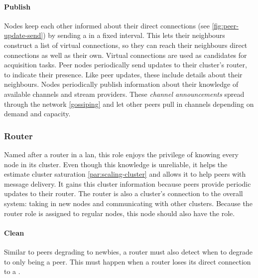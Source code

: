 \paragraph{Publish}\label{par:design-roles-peer-publish}
\begin{itemize}
     Nodes keep each other informed about their direct connections (see \vref{fig:peer-update-send}) by sending a \peerUpdate in a fixed interval. This lets their neighbours construct a list of virtual connections, so they can reach their neighbours direct connections as well as their own. Virtual connections are used as candidates for acquisition tasks.
     Peer nodes periodically send updates to their cluster's router, to indicate their presence. Like peer updates, these include details about their neighbours.
    \label{item:peer-publish-channel-announcement} Nodes periodically publish information about their knowledge of available channels and stream providers. These \textit{channel announcements} spread through the network \ref{gossiping} and let other peers pull in channels depending on demand and capacity.
\end{itemize}

\subsubsection{Router}\label{sec:design-roles-router}
Named after a router in a \gls{lan}, this role enjoys the privilege of knowing every node in its cluster. Even though this knowledge is unreliable, it helps the \routerRole estimate cluster saturation \cref{par:scaling-cluster} and allows it to help peers with message delivery. It gains this cluster information because peers provide periodic updates to their router. The router is also a cluster's connection to the overall system: taking in new nodes and communicating with other clusters. Because the router role is assigned to regular nodes, this node should also have the \peerRole role.

\paragraph{Clean}\label{par:design-roles-router-clean}
\begin{itemize}
     Similar to peers degrading to newbies, a router must also detect when to degrade to only being a peer. This must happen when a router loses its direct connection to a \signalRole.
\end{itemize}

